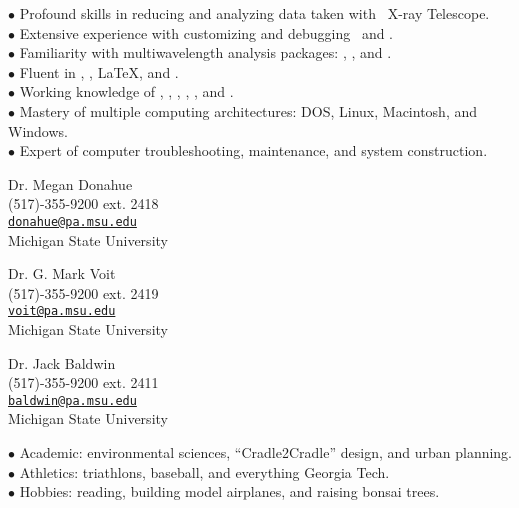 \documentclass[12pt]{cv}
\begin{document}
\begin{llist}

$\bullet$ Profound skills in reducing and analyzing data taken with \Chandra\ X-ray Telescope.\\
$\bullet$ Extensive experience with customizing and debugging \Ciao\ and \Caldb.\\
$\bullet$ Familiarity with multiwavelength analysis packages: \aips, \iraf, and \pyraf.\\
$\bullet$ Fluent in \perl, \idl, \LaTeX, and \html.\\
$\bullet$ Working knowledge of \clang, \flash, \fortran, \mysql, \supmo, and \tcl.\\
$\bullet$ Mastery of multiple computing architectures: DOS, Linux, Macintosh, and Windows.\\
$\bullet$ Expert of computer troubleshooting, maintenance, and system construction.



{\sc Dr. Megan Donahue}\\
(517)-355-9200 ext. 2418\\
\href{mailto:donahue@pa.msu.edu}{\tt donahue@pa.msu.edu}\\
Michigan State University

{\sc Dr. G. Mark Voit}\\
(517)-355-9200 ext. 2419\\
\href{mailto:voit@pa.msu.edu}{\tt voit@pa.msu.edu}\\
Michigan State University

{\sc Dr. Jack Baldwin}\\
(517)-355-9200 ext. 2411\\
\href{mailto:baldwin@pa.msu.edu}{\tt baldwin@pa.msu.edu}\\
Michigan State University


$\bullet$ Academic: environmental sciences, ``Cradle2Cradle'' design, and urban planning.\\
$\bullet$ Athletics: triathlons, baseball, and everything Georgia Tech.\\
$\bullet$ Hobbies: reading, building model airplanes, and raising bonsai trees.\\

\end{llist}
\end{document}
